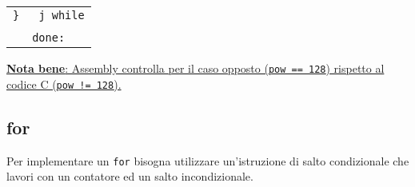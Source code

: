 \documentclass[../main.tex]{subfiles}
\begin{document}
\begin{tabular}{ p{7cm} p{7cm} }
    \texttt{\}} & \texttt{ \hspace*{0cm} \hspace*{0cm} \hspace*{0cm} \hspace*{0cm} \hspace*{0cm} \hspace*{0cm} \hspace*{0cm} j while} \\
    \\
    & \texttt{done:} \\
\end{tabular}

\vspace*{2.5mm}

\noindent
\underline{\textbf{Nota bene}: Assembly controlla per il caso
opposto (\texttt{pow == 128}) rispetto al codice C (\texttt{pow != 128}).}

\subsection{for}
\vspace*{-2mm}
Per implementare un \texttt{for} bisogna utilizzare un'istruzione
di salto condizionale che lavori con un contatore ed un
salto incondizionale.

\vspace*{2.5mm}
\end{document}
